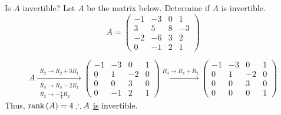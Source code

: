 \begin{example}{Is $A$ invertible?}{}
    Let $A$ be the matrix below. Determine if $A$ is invertible.
    \[
        A = \begin{pmatrix}
            -1 & -3 & 0 & 1 \\
            3 & 5 & 8 & -3 \\
            -2 & -6 & 3 & 2 \\
            0 & -1 & 2 & 1 
        \end{pmatrix} 
    \]
    \begin{solution}
        \[
            A \xrightarrow[\substack{R_3 \to R_3 - 2R_1 \\ R_2 \to -\frac{1}{4}R_2}]{R_2 \to R_2 + 3R_1}
            \begin{pmatrix}
                -1 & -3 & 0 & 1 \\
                0 & 1 & -2 & 0 \\
                0 & 0 & 3 & 0 \\
                0 & -1 & 2 & 1 
            \end{pmatrix}
            \xrightarrow{R_4 \to R_4 + R_2}
            \begin{pmatrix}
                -1 & -3 & 0 & 1 \\
                0 & 1 & -2 & 0 \\
                0 & 0 & 3 & 0 \\
                0 & 0 & 0 & 1 
            \end{pmatrix}
        \]
        Thus, $\text{rank}\left(A\right)=4 \therefore A$ \underline{is} invertible.
    \end{solution}
\end{example}